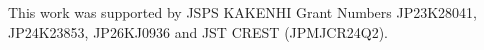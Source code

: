 \documentclass[11pt]{article}
\theoremstyle{definition}
\theoremstyle{remark}
\begin{document}
This work was supported by JSPS KAKENHI Grant Numbers JP23K28041, JP24K23853, JP26KJ0936 and JST CREST (JPMJCR24Q2).

% 


\begin{appendices}
    
\end{appendices}
\end{document}

